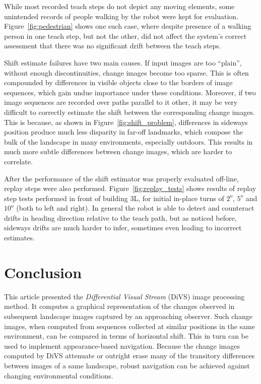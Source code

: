\documentclass[twocolumn, 9pt,fleqn]{jsproceedings}
\begin{document}
While most recorded teach steps do not depict any moving elements, some unintended records of people walking by the robot were kept for evaluation. Figure~\ref{fig:pedestrian} shows one such case, where despite presence of a walking person in one teach step, but not the other, did not affect the system's correct assessment that there was no significant drift between the teach steps.

Shift estimate failures have two main causes. If input images are too ``plain'', without enough discontinuities, change images become too sparse. This is often compounded by differences in visible objects close to the borders of image sequences, which gain undue importance under these conditions. Moreover, if two image sequences are recorded over paths parallel to it other, it may be very difficult to correctly estimate the shift between the corresponding change images. This is because, as shown in Figure~\ref{fig:shift_problem}, differences in sideways position produce much less disparity in far-off landmarks, which compose the bulk of the landscape in many environments, especially outdoors. This results in much more subtle differences between change images, which are harder to correlate.

After the performance of the shift estimator was properly evaluated off-line, replay steps were also performed. Figure~\ref{fig:replay_tests} shows results of replay step tests performed in front of building 3L, for initial in-place turns of $2^o$, $5^o$ and $10^o$ (both to left and right). In general the robot is able to detect and counteract drifts in heading direction relative to the teach path, but as noticed before, sideways drifts are much harder to infer, sometimes even leading to incorrect estimates.

\section{Conclusion}

This article presented the \textit{Differential Visual Stream} (DiVS) image processing method. It computes a graphical representation of the changes observed in subsequent landscape images captured by an approaching observer. Such change images, when computed from sequences collected at similar positions in the same environment, can be compared in terms of horizontal shift. This in turn can be used to implement appearance-based navigation. Because the change images computed by DiVS attenuate or outright erase many of the transitory differences between images of a same landscape, robust navigation can be achieved against changing environmental conditions.
\end{document}
